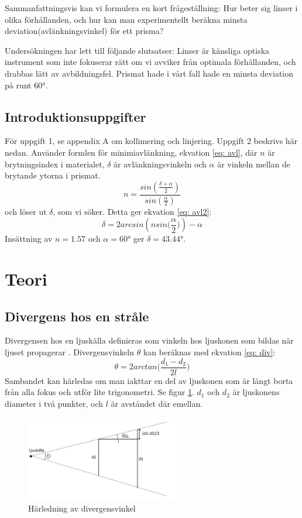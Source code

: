 \documentclass[a4paper]{article}
\begin{document}
Sammanfattningsvis kan vi formulera en kort frågeställning: Hur beter sig linser i olika förhållanden, och hur kan man experimentellt beräkna minsta 
deviation(avlänkningsvinkel) för ett prisma?

Undersökningen har lett till följande slutsatser: Linser är känsliga optiska instrument som inte fokuserar rätt om vi avviker från optimala förhållanden,
och drabbas lätt av avbildningsfel. Prismat hade i vårt fall hade en minsta deviation på runt \ang{60}. 
\subsection{Introduktionsuppgifter}
För uppgift 1, se appendix A om kollimering och linjering. 
Uppgift 2 beskrivs här nedan.
Använder formlen för minimiavlänkning, ekvation \ref{eq: avl}\cite[p. 212]{vl}, där $n$ är brytningsindex i materialet, $\delta$ är avlänkningsvinkeln och 
$\alpha$ är vinkeln mellan de brytande ytorna i prismat.
\begin{equation}
    \label{eq: avl}
    n = \frac{sin(\frac{\delta +\alpha}{2})}{sin(\frac{\alpha}{2})}
\end{equation}
och löser ut $\delta$, som vi söker. Detta ger ekvation \ref{eq: avl2}:
\begin{equation}
    \label{eq: avl2}
    \delta = 2 arcsin(n sin\big(\frac{\alpha}{2}\big)) - \alpha
\end{equation}
Insättning av $n=1.57$ och $\alpha = \ang{60}$ ger $\delta = \ang{43.44}$.

\section{Teori}
\subsection{Divergens hos en stråle}
Divergensen hos en ljuskälla definieras som vinkeln hos ljuskonen som bildas när ljuset propagerar \cite{wiki}. Divergensvinkeln $\theta$ kan beräknas med ekvation \ref{eq: div}:
\begin{equation}
    \theta = 2 arctan\Big(\frac{d_1 - d_2}{2l}\Big)
    \label{eq: div}
\end{equation}
Sambandet kan härledas om man iakttar en del av ljuskonen som är långt borta från alla fokus och utför lite trigonometri. Se figur \ref{fig:divergens}. $d_1$ och $d_2$
är ljuskonens diameter i två punkter, och $l$ är avståndet där emellan.  
\begin{figure}[h!]
    \centering
    \includegraphics[width=0.6\textwidth]{divergens}
    \caption{Härledning av divergensvinkel}
    \label{fig:divergens}
\end{figure}
\pagebreak
\end{document}
